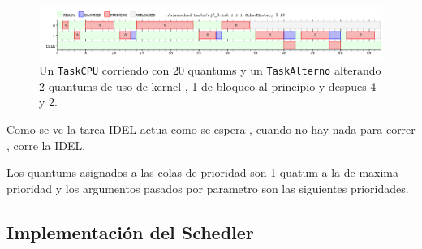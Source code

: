 	\begin{figure}[ht]
		\begin{center}
			\includegraphics[width=1\columnwidth]{imagenes/ej7_3.png}
			\caption{Un \texttt{TaskCPU} corriendo con 20 quantums y un \texttt{TaskAlterno} alterando 2 quantums de uso de kernel , 1 de bloqueo al principio y despues 4 y 2.}
		\end{center}
	\end{figure}

	Como se ve la tarea IDEL  actua como se espera , cuando no hay nada para correr , corre la IDEL.

	Los quantums asignados a las colas de prioridad son 1 quatum a la de maxima prioridad y los argumentos pasados por parametro son las siguientes prioridades.

	\subsection{Implementación del Schedler}




